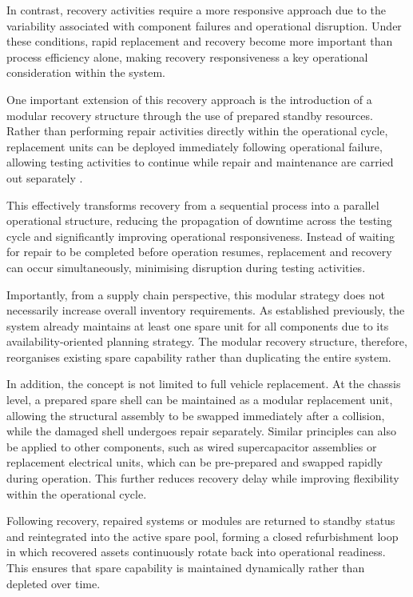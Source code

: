 \documentclass[11pt, a4paper]{report}
\numberwithin{equation}{section}
\begin{document}
\begin{refsection}
In contrast, recovery activities require a more responsive approach due to the variability associated with component failures and operational disruption. Under these conditions, rapid replacement and recovery become more important than process efficiency alone, making recovery responsiveness a key operational consideration within the system.

One important extension of this recovery approach is the introduction of a modular recovery structure through the use of prepared standby resources. Rather than performing repair activities directly within the operational cycle, replacement units can be deployed immediately following operational failure, allowing testing activities to continue while repair and maintenance are carried out separately \cite {modular}.

This effectively transforms recovery from a sequential process into a parallel operational structure, reducing the propagation of downtime across the testing cycle and significantly improving operational responsiveness. Instead of waiting for repair to be completed before operation resumes, replacement and recovery can occur simultaneously, minimising disruption during testing activities.

Importantly, from a supply chain perspective, this modular strategy does not necessarily increase overall inventory requirements. As established previously, the system already maintains at least one spare unit for all components due to its availability-oriented planning strategy. The modular recovery structure, therefore, reorganises existing spare capability rather than duplicating the entire system.

In addition, the concept is not limited to full vehicle replacement. At the chassis level, a prepared spare shell can be maintained as a modular replacement unit, allowing the structural assembly to be swapped immediately after a collision, while the damaged shell undergoes repair separately. Similar principles can also be applied to other components, such as wired supercapacitor assemblies or replacement electrical units, which can be pre-prepared and swapped rapidly during operation. This further reduces recovery delay while improving flexibility within the operational cycle.

Following recovery, repaired systems or modules are returned to standby status and reintegrated into the active spare pool, forming a closed refurbishment loop in which recovered assets continuously rotate back into operational readiness. This ensures that spare capability is maintained dynamically rather than depleted over time.


\end{refsection}
\end{document}
